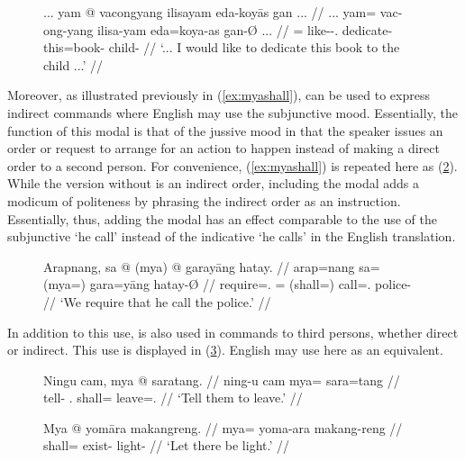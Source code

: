 \begin{figure}[h]
\ex\label{ex:vacmodfull}\begingl
	\gla ... yam @ vacongyang ilisayam eda-koyās gan ... //
	\glb ... yam= vac-ong-yang ilisa-yam eda=koya-as gan-Ø ... //
	\glc {} \DatT{}= like-\Irr{}-\Fsg{}.\Aarg{} dedicate-\Ptcp{} 		
		this=book-\Parg{} child-\Top{} {} //
	\glft `... I would like to dedicate this book to the child ...' 
		 //
\endgl\xe
\end{figure}

Moreover, as illustrated previously in (\ref{ex:myashall}),  can be used to express indirect commands where English may
use the subjunctive mood. Essentially, the function of this modal is that of
the jussive mood in that the speaker issues an order or request to arrange for
an action to happen instead of making a direct order to a second person. For
convenience, (\ref{ex:myashall}) is repeated here as (\ref{ex:myashall_2}).
While the version without  is an indirect order, including the
modal adds a modicum of politeness by phrasing the indirect order as an
instruction. Essentially, thus, adding the modal has an effect comparable to
the use of the subjunctive `he call' instead of the indicative `he calls' in
the English translation.

\begin{figure}[h]
\ex\label{ex:myashall_2}\begingl
	\gla Arapnang, sa @ \textup{(}mya\textup{)} @ garayāng hatay. //
	\glb arap=nang sa= (mya=) gara=yāng hatay-Ø //
	\glc require=\Fpl{}.\Aarg{} \PatT{}= (shall=) call=\TsgM{}.\Aarg{}
	police-\Top{} //
	\glft `We require that he call the police.' //
\endgl\xe
\end{figure}

In addition to this use,  is also used in commands to third
persons, whether direct or indirect. This use is displayed in
(\ref{ex:indirimp}). English may use  here as an equivalent.

\begin{figure}[h]
\pex\label{ex:indirimp}
\a\begingl
	\gla Ningu cam, mya @ saratang. //
	\glb ning-u cam mya= sara=tang //
	\glc tell-\Imp{} \TplM{}.\Dat{} shall= leave=\TplM{}.\Aarg{} //
	\glft `Tell them to leave.' //
\endgl


\a\begingl
	\gla Mya @ yomāra makangreng. //
	\glb mya= yoma-ara makang-reng //
	\glc shall= exist-\TsgI{} light-\AargI{} //
	\glft `Let there be light.' //
\endgl
\xe
\end{figure}

